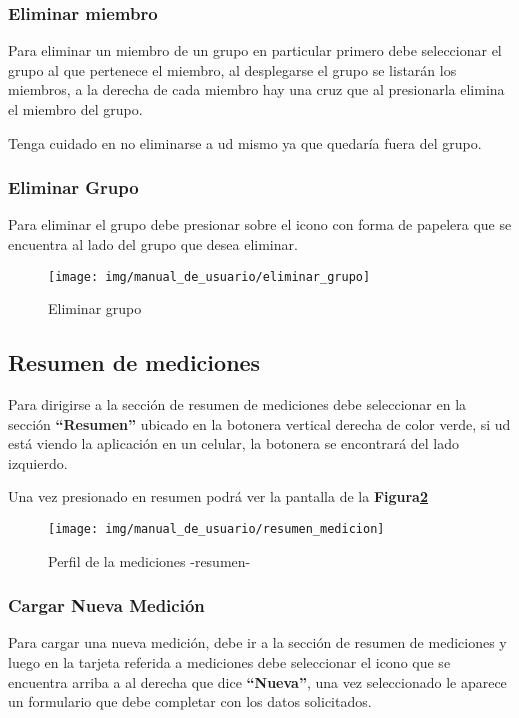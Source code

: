 \subsubsection{Eliminar miembro}
Para eliminar un miembro de un grupo en particular primero debe seleccionar el grupo al que pertenece el miembro, al desplegarse el grupo se listarán los miembros, a la derecha de cada miembro hay una cruz que al presionarla elimina el miembro del grupo.

Tenga cuidado en no eliminarse a ud mismo ya que quedaría fuera del grupo.

\subsubsection{Eliminar Grupo}

Para eliminar el grupo debe presionar sobre el icono con forma de papelera que se encuentra al lado del grupo que desea eliminar.
    \begin{figure}
    	\centering
    	\texttt{[image: img/manual\_de\_usuario/eliminar\_grupo]}
    	\caption{Eliminar grupo}
    	\label{mu-eliminar_grupo}
    \end{figure}
    
    
    
    
    
\subsection{Resumen de mediciones}    
Para dirigirse a la sección de resumen de mediciones debe seleccionar en la sección \textbf{``Resumen''} ubicado en la botonera vertical derecha de color verde, si ud está viendo la aplicación en un celular, la botonera se encontrará del lado izquierdo.

Una vez presionado en resumen podrá ver la pantalla de la \textbf{Figura\ref{mu-resumen_medicion}}
 

    \begin{figure}
    	\centering
    	\texttt{[image: img/manual\_de\_usuario/resumen\_medicion]}
    	\caption{Perfil de la mediciones -resumen-}
    	\label{mu-resumen_medicion}
    \end{figure}


\subsubsection{Cargar Nueva Medición}
Para cargar una nueva medición, debe ir a la sección de resumen de mediciones y luego en la tarjeta referida a mediciones debe seleccionar el icono que se encuentra arriba a al derecha que dice \textbf{``Nueva''}, una vez seleccionado le aparece un formulario que debe completar con los datos solicitados.

